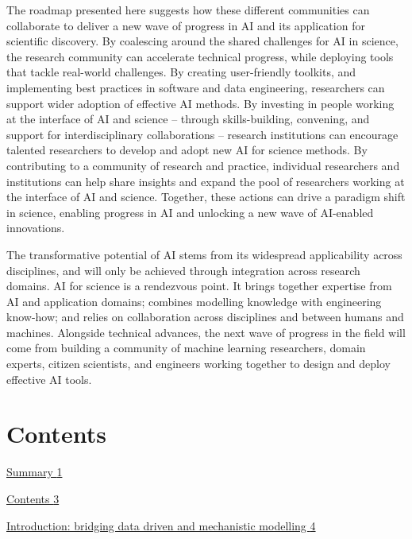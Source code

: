 The roadmap presented here suggests how these different communities can
collaborate to deliver a new wave of progress in AI and its application
for scientific discovery. By coalescing around the shared challenges for
AI in science, the research community can accelerate technical progress,
while deploying tools that tackle real-world challenges. By creating
user-friendly toolkits, and implementing best practices in software and
data engineering, researchers can support wider adoption of effective AI
methods. By investing in people working at the interface of AI and
science -- through skills-building, convening, and support for
interdisciplinary collaborations -- research institutions can encourage
talented researchers to develop and adopt new AI for science methods. By
contributing to a community of research and practice, individual
researchers and institutions can help share insights and expand the pool
of researchers working at the interface of AI and science. Together,
these actions can drive a paradigm shift in science, enabling progress
in AI and unlocking a new wave of AI-enabled innovations.

The transformative potential of AI stems from its widespread
applicability across disciplines, and will only be achieved through
integration across research domains. AI for science is a rendezvous
point. It brings together expertise from AI and application domains;
combines modelling knowledge with engineering know-how; and relies on
collaboration across disciplines and between humans and machines.
Alongside technical advances, the next wave of progress in the field
will come from building a community of machine learning researchers,
domain experts, citizen scientists, and engineers working together to
design and deploy effective AI tools.

\hypertarget{contents}{%
\section{Contents}\label{contents}}

\protect\hyperlink{summary}{Summary \protect\hyperlink{summary}{1}}

\protect\hyperlink{_Toc121762019}{Contents
\protect\hyperlink{_Toc121762019}{3}}

\protect\hyperlink{introduction-bridging-data-driven-and-mechanistic-modelling}{Introduction:
bridging data driven and mechanistic modelling
\protect\hyperlink{introduction-bridging-data-driven-and-mechanistic-modelling}{4}}

